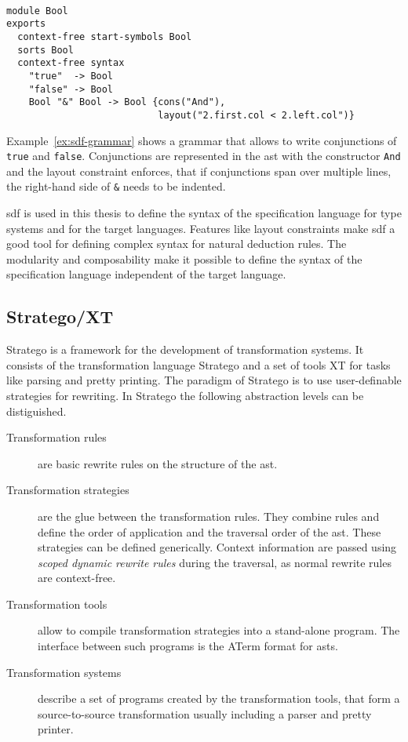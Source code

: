 \begin{example}{~}
\begin{verbatim}
module Bool
exports
  context-free start-symbols Bool
  sorts Bool
  context-free syntax
    "true"  -> Bool
    "false" -> Bool
    Bool "&" Bool -> Bool {cons("And"),
                           layout("2.first.col < 2.left.col")}
\end{verbatim}
\label{ex:sdf-grammar}
\end{example}

Example~\ref{ex:sdf-grammar} shows a grammar that allows to write
conjunctions of \verb|true| and \verb|false|. Conjunctions are
represented in the \gls{ast} with the constructor \verb|And| and the
layout constraint enforces, that if conjunctions span over multiple
lines, the right-hand side of \verb|&| needs to be indented.

\gls{sdf} is used in this thesis to define the syntax of the
specification language for type systems and for the target
languages. Features like layout constraints make \gls{sdf} a good tool
for defining complex syntax for natural deduction rules. The
modularity and composability make it possible to define the syntax of
the specification language independent of the target language.
\subsection{Stratego/XT}
Stratego is a framework for the development of transformation
systems. It consists of the transformation language Stratego and a set
of tools XT for tasks like parsing and pretty printing. The paradigm
of Stratego is to use user-definable strategies for
rewriting. In Stratego the following abstraction levels can be
distiguished.

\begin{description}
\item[Transformation rules] are basic rewrite rules on the structure
  of the \gls{ast}.
\item[Transformation strategies] are the glue between the
  transformation rules. They combine rules and define the order of
  application and the traversal order of the \gls{ast}. These strategies can
  be defined generically. Context information are passed using
  \textit{scoped dynamic rewrite rules} during the traversal, as
  normal rewrite rules are context-free.
\item[Transformation tools] allow to compile transformation strategies
  into a stand-alone program. The interface between such programs is
  the ATerm format for \glspl{ast}.
\item[Transformation systems] describe a set of programs created by
  the transformation tools, that form a source-to-source
  transformation usually including a parser and pretty printer.
\end{description}

